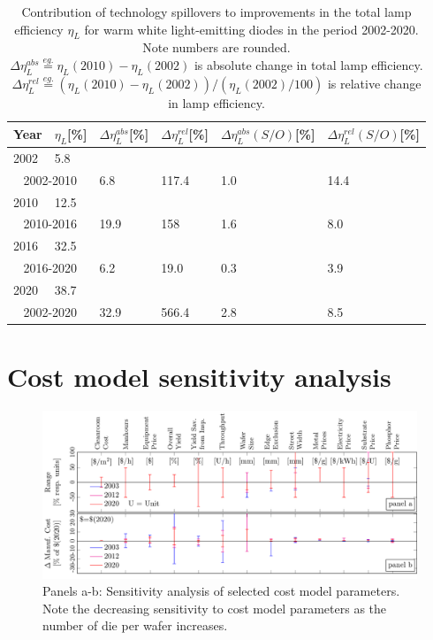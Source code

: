 \documentclass[10pt]{article}
\begin{document}
    \begin{table}[h!]
        \centering
    	\begin{tabularx}{\textwidth}{|l|l|X|X|X|X|}
    		\hline
    			Year & $\eta_L$[\%]  & $\Delta \eta_L^{abs}$[\%] & $\Delta \eta_L^{rel}$[\%]  & $\Delta \eta_L^{abs}(S/O)$[\%]  & $\Delta \eta_L^{rel}(S/O)$[\%]  \\
    		\hline
    			2002 & 5.8 & \multicolumn{4}{c|}{\cellcolor{silver}} \\
    		\hline
    		    \multicolumn{2}{|c|}{2002-2010} & 6.8 & 117.4 & 1.0 & 14.4 \\
    		\hline
    			2010 & 12.5 & \multicolumn{4}{c|}{\cellcolor{silver}} \\
    		\hline
    		    \multicolumn{2}{|c|}{2010-2016} & 19.9 & 158 & 1.6 & 8.0 \\
    		\hline
    			2016 & 32.5 & \multicolumn{4}{c|}{\cellcolor{silver}} \\
    		\hline
    		    \multicolumn{2}{|c|}{2016-2020} & 6.2 & 19.0 & 0.3 & 3.9 \\
    		\hline
    			2020 & 38.7 & \multicolumn{4}{c|}{\cellcolor{silver}} \\
    		\hline
    		    \multicolumn{2}{|c|}{2002-2020} & 32.9 & 566.4 & 2.8 & 8.5 \\
            \hline
    	\end{tabularx}
    	\caption{Contribution of technology spillovers to improvements in the total lamp efficiency $\eta_L$ for warm white light-emitting diodes in the period 2002-2020. Note numbers are rounded. \\ $\Delta \eta_L^{abs}\overset{eg.}{=}\eta_L(2010)-\eta_L(2002)$ is absolute change in total lamp efficiency. \\ $\Delta \eta_L^{rel}\overset{eg.}{=}(\eta_L(2010)-\eta_L(2002))/(\eta_L(2002)/100)$ is relative change in lamp efficiency.}
    	\label{tab:spillover-data}
    \end{table}


\section{Cost model sensitivity analysis}

\begin{figure}
	\centering
    \includegraphics[width=\textwidth]{2_SSL_EES/article/figures/costmodel_sensitivity.pdf}
	\caption{Panels a-b: Sensitivity analysis of selected cost model parameters. Note the decreasing sensitivity to cost model parameters as the number of die per wafer increases.}
	\label{fig:costmodel_calibration}
\end{figure}
\end{document}
